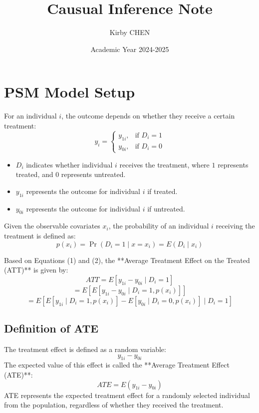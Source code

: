 \documentclass[10pt, oneside]{article}
\title{Causual Inference Note}
\author{Kirby CHEN}
\date{Academic Year 2024-2025}
\begin{document}
\maketitle
\tableofcontents

\vspace{.25in}

\section{PSM Model Setup}

For an individual $i$, the outcome depends on whether they receive a certain treatment:
\begin{equation}
y_i =
\begin{cases}
y_{1i}, & \text{if } D_i = 1 \\
y_{0i}, & \text{if } D_i = 0
\end{cases}
\end{equation}

\begin{itemize}
    \item $D_i$ indicates whether individual $i$ receives the treatment, where $1$ represents treated, and $0$ represents untreated.
    \item $y_{1i}$ represents the outcome for individual $i$ if treated.
    \item $y_{0i}$ represents the outcome for individual $i$ if untreated.
\end{itemize}

Given the observable covariates $x_i$, the probability of an individual $i$ receiving the treatment is defined as:
\begin{equation}
p(x_i) = \Pr(D_i = 1 \mid x = x_i) = E(D_i \mid x_i)
\end{equation}

Based on Equations (1) and (2), the **Average Treatment Effect on the Treated (ATT)** is given by:
\begin{equation}
ATT = E[y_{1i} - y_{0i} \mid D_i = 1]
\end{equation}
\begin{equation}
= E[E[y_{1i} - y_{0i} \mid D_i = 1, p(x_i)]]
\end{equation}
\begin{equation}
= E[E[y_{1i} \mid D_i = 1, p(x_i)] - E[y_{0i} \mid D_i = 0, p(x_i)] \mid D_i = 1]
\end{equation}

\subsection{Definition of ATE}
The treatment effect is defined as a random variable:
\begin{equation}
y_{1i} - y_{0i}
\end{equation}
The expected value of this effect is called the **Average Treatment Effect (ATE)**:
\begin{equation}
ATE = E(y_{1i} - y_{0i})
\end{equation}
ATE represents the expected treatment effect for a randomly selected individual from the population, regardless of whether they received the treatment.
\end{document}
